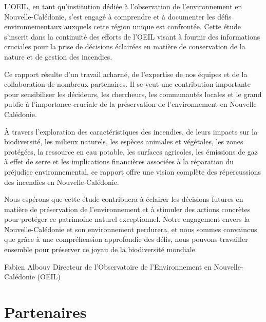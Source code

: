\documentclass[
  11pt,
  letterpaper,
]{scrreprt}
\begin{document}
L'OEIL, en tant qu'institution dédiée à l'observation de l'environnement
en Nouvelle-Calédonie, s'est engagé à comprendre et à documenter les
défis environnementaux auxquels cette région unique est confrontée.
Cette étude s'inscrit dans la continuité des efforts de l'OEIL visant à
fournir des informations cruciales pour la prise de décisions éclairées
en matière de conservation de la nature et de gestion des incendies.

Ce rapport résulte d'un travail acharné, de l'expertise de nos équipes
et de la collaboration de nombreux partenaires. Il se veut une
contribution importante pour sensibiliser les décideurs, les chercheurs,
les communautés locales et le grand public à l'importance cruciale de la
préservation de l'environnement en Nouvelle-Calédonie.

À travers l'exploration des caractéristiques des incendies, de leurs
impacts sur la biodiversité, les milieux naturels, les espèces animales
et végétales, les zones protégées, la ressource en eau potable, les
surfaces agricoles, les émissions de gaz à effet de serre et les
implications financières associées à la réparation du préjudice
environnemental, ce rapport offre une vision complète des répercussions
des incendies en Nouvelle-Calédonie.

Nous espérons que cette étude contribuera à éclairer les décisions
futures en matière de préservation de l'environnement et à stimuler des
actions concrètes pour protéger ce patrimoine naturel exceptionnel.
Notre engagement envers la Nouvelle-Calédonie et son environnement
perdurera, et nous sommes convaincus que grâce à une compréhension
approfondie des défis, nous pouvons travailler ensemble pour préserver
ce joyau de la biodiversité mondiale.

Fabien Albouy Directeur de l'Observatoire de l'Environnement en
Nouvelle-Calédonie (OEIL)


\chapter*{Partenaires}\label{partenaires}

\end{document}
